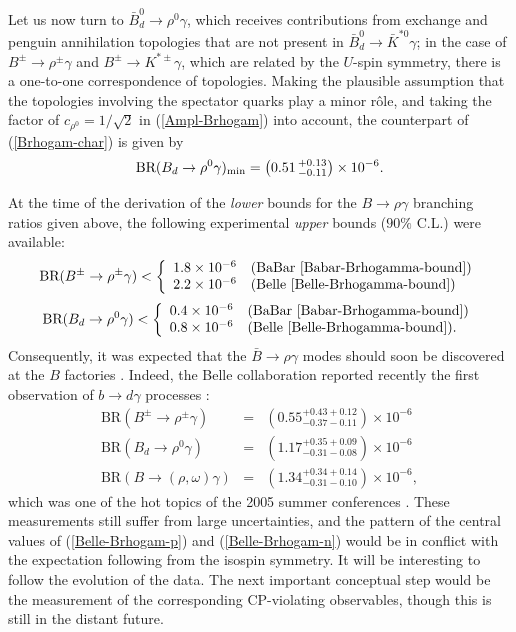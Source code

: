 \documentclass[12pt]{article}
\begin{document}
Let us now turn to $\bar B^0_d\to\rho^0\gamma$, which receives 
contributions from exchange and penguin annihilation topologies that are 
not present in 
$\bar B^0_d\to \bar K^{\ast0}\gamma$; in the case of $B^\pm\to\rho^\pm\gamma$ 
and $B^\pm\to K^{\ast\pm}\gamma$, which are related by the $U$-spin symmetry, 
there is a one-to-one correspondence of topologies. Making the 
plausible assumption that the topologies involving the spectator quarks play 
a minor r\^ole, and taking the factor of $c_{\rho^0}=1/\sqrt{2}$ in 
(\ref{Ampl-Brhogam}) into account, the counterpart of (\ref{Brhogam-char}) 
is given by 
\begin{equation}\label{Brhogam-neut}
\mbox{BR}(B_d\to \rho^0\gamma)_{\rm min}=\left(0.51\,^{+0.13}_{-0.11}
\right)\times10^{-6}.
\end{equation}

At the time of the derivation of the {\it lower} bounds for the
$B\to\rho\gamma$ branching ratios given above, the following experimental {\it upper}
bounds ($90\%$ C.L.) were available:
\begin{equation}\label{Brho-gam-char-EXP}
\mbox{BR}(B^\pm\to \rho^\pm\gamma)<\left\{\begin{array}{ll}
1.8\times 10^{-6} & \mbox{(BaBar \cite{Babar-Brhogamma-bound})}\\
2.2\times 10^{-6} & \mbox{(Belle \cite{Belle-Brhogamma-bound})}\\
\end{array} \right.
\end{equation}
\begin{equation}\label{Brho-gam-neut-EXP}
\mbox{BR}(B_d\to \rho^0\gamma)<\left\{\begin{array}{ll}
0.4\times 10^{-6} & \mbox{(BaBar \cite{Babar-Brhogamma-bound})}\\
0.8\times 10^{-6} & \mbox{(Belle \cite{Belle-Brhogamma-bound}).}
\end{array} \right.
\end{equation}
Consequently, it was expected that the $\bar B\to\rho\gamma$ modes should 
soon be discovered at the $B$ factories \cite{FR2}. Indeed, the Belle 
collaboration reported recently the first observation of $b\to d\gamma$ processes
\cite{Belle-bdgam-obs}:
\begin{eqnarray}
\mbox{BR}(B^\pm\to \rho^\pm\gamma)&=&\left(0.55^{+0.43+0.12}_{-0.37-0.11}\right)
\times 10^{-6}
\label{Belle-Brhogam-p}\\
\mbox{BR}(B_d\to \rho^0\gamma)&=&\left(1.17^{+0.35+0.09}_{-0.31-0.08}\right)
\times 10^{-6}
\label{Belle-Brhogam-n}\\
\mbox{BR}(B\to(\rho,\omega)\gamma)&=&
\left(1.34^{+0.34+0.14}_{-0.31-0.10}\right)\times 10^{-6},
\end{eqnarray}
which was one of the hot topics of the 2005 summer conferences \cite{Belle-press}.
These measurements still suffer from large uncertainties, and the pattern of the 
central values of (\ref{Belle-Brhogam-p}) and (\ref{Belle-Brhogam-n}) would be in
conflict with the expectation following from the isospin symmetry. It will be interesting
to follow the evolution of the data. The next important conceptual step would be the measurement of the corresponding CP-violating observables, though
 this is still
in the distant future.
\end{document}
